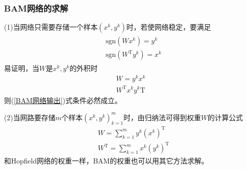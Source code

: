         \subsubsection{BAM网络的求解}
            \par
            (1)当网络只需要存储一个样本$(x^k,y^k)$时，若使网络稳定，要满足
            \begin{align}
            \label{BAM网络输出}
            \begin{aligned}
            & \mathrm{sgn}(Wx^k) = y^k\\
            & \mathrm{sgn}(W^\mathrm{T}y^k) = x^k
            \end{aligned}
            \end{align}
            易证明，当$W$是$x^k,y^k$的外积时
            \begin{align*}
            W = y^k x^k\\
            W^\mathrm{T}x^ky^k\mathrm{T}
            \end{align*}
            则(\ref{BAM网络输出})式条件必然成立。
            \par
            (2)当网路要存储$m$个样本$(x^k,y^k)_{k=1}^m$时，由归纳法可得到权重$W$的计算公式
            \begin{align*}
            & W = \sum_{k=1}^my^k(x^k)^\mathrm{T}\\
            & W^\mathrm{T}= \sum_{k=1}^mx^k(y^k)^\mathrm{T}
            \end{align*}
            和Hopfield网络的权重一样，BAM的权重也可以用其它方法求解。
